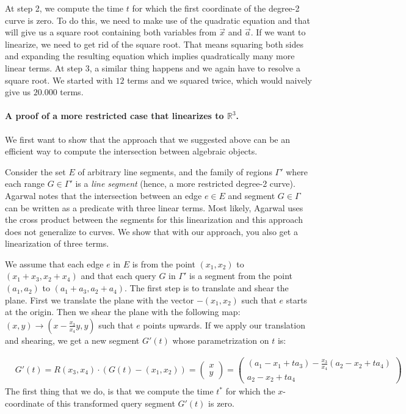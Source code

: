 \documentclass[UKenglish]{lipics-v2019}
\begin{document}
At step 2, we compute the time $t$ for which the first coordinate of the degree-2 curve is zero. To do this, we need to make use of the quadratic equation and that will give us a square root containing both variables from $\vec{x}$ and $\vec{a}$. If we want to linearize, we need to get rid of the square root. That means squaring both sides and expanding the resulting equation which implies quadratically many more linear terms. At step 3, a similar thing happens and we again have to resolve a square root. We started with $12$ terms and we squared twice, which would naively give us $20.000$ terms.



\paragraph*{A proof of a more restricted case that linearizes to $\mathbb{R}^3$.}
We first want to show that the approach that we suggested above can be an efficient way to compute the intersection between algebraic objects. %

Consider the set $E$ of arbitrary line segments, and the family of regions $\Gamma'$ where each range $G \in \Gamma'$ is a \emph{line segment} (hence, a more restricted degree-2 curve). Agarwal notes \cite{agarwal2004range} that the intersection between an edge $e \in E$ and segment $G \in \Gamma$ can be written as a predicate with three linear terms. Most likely, Agarwal uses the cross product between the segments for this linearization and this approach does not generalize to curves. We show that with our approach, you also get a linearization of three terms. 

We assume that each edge $e$ in $E$ is from the point $(x_1, x_2)$ to $(x_1 + x_3, x_2 + x_4)$ and that each query $G$ in $\Gamma'$ is a segment from the point $(a_1, a_2)$ to $(a_1 + a_3, a_2 + a_4)$. The first step is to translate and shear the plane.
First we translate the plane with the vector $-(x_1, x_2)$ such that $e$ starts at the origin. Then we shear the plane with the following map: $(x,y) \rightarrow (x - \frac{x_3}{x_4}y, y)$ such that $e$ points upwards. 
If we apply our translation and shearing, we get a new segment $G'(t)$ whose parametrization on $t$ is:

\begin{align*}
    &G'(t) = R(x_3, x_4) \cdot (G(t) - (x_1, x_2)) =  
    \left( \begin{array}{c}
         x  \\
         y 
    \end{array} \right) =
    \left( \begin{array}{c}
         (a_1 - x_1 + t a_3) - \frac{x_3}{x_4}(a_2 - x_2 + t a_4 )  \\
         a_2 - x_2 + t a_4 
    \end{array} \right)
\end{align*}
The first thing that we do, is that we compute the time $t^*$ for which the $x$-coordinate of this transformed query segment $G'(t)$ is zero.
\end{document}
